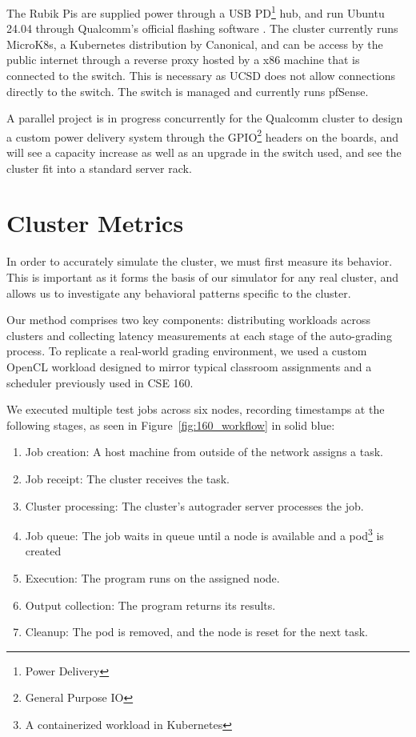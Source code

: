 \documentclass[acmlarge]{acmart}
\begin{document}
The Rubik Pis are supplied power through a USB PD\footnote{Power Delivery} hub, and run Ubuntu 24.04 through Qualcomm's official flashing software \cite{thundercomm_rubikpi3_docs}. The cluster currently runs MicroK8s, a Kubernetes distribution by Canonical, and can be access by the public internet through a reverse proxy hosted by a x86 machine that is connected to the switch. This is necessary as UCSD does not allow connections directly to the switch. The switch is managed and currently runs pfSense.

A parallel project is in progress concurrently for the Qualcomm cluster to design a custom power delivery system through the GPIO\footnote{General Purpose IO} headers on the boards, and will see a capacity increase as well as an upgrade in the switch used, and see the cluster fit into a standard server rack.

\section{Cluster Metrics}

In order to accurately simulate the cluster, we must first measure its behavior. This is important as it forms the basis of our simulator for any real cluster, and allows us to investigate any behavioral patterns specific to the cluster.

Our method comprises two key components: distributing workloads across clusters and collecting latency measurements at each stage of the auto-grading process. To replicate a real-world grading environment, we used a custom OpenCL workload designed to mirror typical classroom assignments and a scheduler previously used in CSE 160.

We executed multiple test jobs across six nodes, recording timestamps at the following stages, as seen in Figure~\ref{fig:160_workflow} in solid blue:

\begin{enumerate}
    \item Job creation: A host machine from outside of the network assigns a task.
    \item Job receipt: The cluster receives the task.
    \item Cluster processing: The cluster’s autograder server processes the job.
    \item Job queue: The job waits in queue until a node is available and a pod\footnote{A containerized workload in Kubernetes} is created
    \item Execution: The program runs on the assigned node.
    \item Output collection: The program returns its results.
    \item Cleanup: The pod is removed, and the node is reset for the next task.
\end{enumerate}
\end{document}
